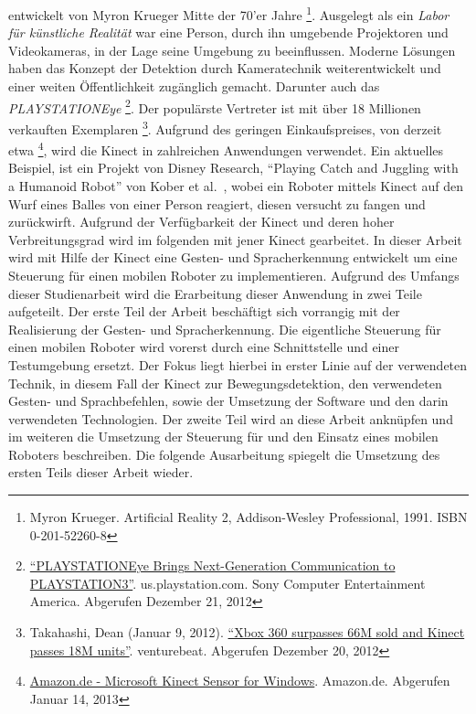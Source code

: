  entwickelt von Myron Krueger Mitte der 70'er Jahre \footnote{Myron Krueger. Artificial Reality 2, Addison-Wesley Professional, 1991. ISBN 0-201-52260-8}.
Ausgelegt als ein \textit{Labor f\"ur k\"unstliche Realit\"at} war eine Person, durch ihn umgebende Projektoren und Videokameras, in der Lage seine Umgebung zu beeinflussen.
Moderne L\"osungen haben das Konzept der Detektion durch Kameratechnik weiterentwickelt und einer weiten \"Offentlichkeit zug\"anglich gemacht. Darunter auch das \textit{PLAYSTATIONEye}
\footnote{\href{http://us.playstation.com/ps3/accessories/playstation-eye-camera-ps3.html}{\enquote{PLAYSTATIONEye Brings Next-Generation Communication to PLAYSTATION3}}. us.playstation.com. Sony Computer Entertainment America. Abgerufen Dezember 21, 2012}.
Der popul\"arste Vertreter ist \textit{} mit \"uber 18 Millionen verkauften Exemplaren
\footnote{Takahashi, Dean (Januar 9, 2012). \href{http://venturebeat.com/2012/01/09/xbox-360-surpassed-66m-sold-and-kinect-has-sold-18m-units/}{\enquote{Xbox 360 surpasses 66M sold and Kinect passes 18M units}}. venturebeat. Abgerufen Dezember 20, 2012}.
\newline
Aufgrund des geringen Einkaufspreises, von derzeit etwa \footnote{\href{http://www.amazon.de/Microsoft-Kinect-Sensor-for-Windows/dp/B0072O6E7K/ref=sr_1_1?ie=UTF8&qid=1358250080&sr=8-1}{Amazon.de - Microsoft Kinect Sensor for Windows}. Amazon.de. Abgerufen Januar 14, 2013}, wird die Kinect in zahlreichen Anwendungen verwendet. Ein aktuelles Beispiel, ist ein Projekt von Disney Research, \enquote{Playing Catch and Juggling with a Humanoid Robot} von Kober et al.~\cite{bib:kober}, wobei ein Roboter mittels Kinect auf den Wurf eines Balles von einer Person reagiert, diesen versucht zu fangen und zur\"uckwirft.
\newline
Aufgrund der Verf\"ugbarkeit der Kinect und deren hoher Verbreitungsgrad wird im folgenden mit jener Kinect gearbeitet.
\newline
In dieser Arbeit wird mit Hilfe der Kinect eine Gesten- und Spracherkennung entwickelt um eine Steuerung f\"ur einen mobilen Roboter zu implementieren.
Aufgrund des Umfangs dieser Studienarbeit wird die Erarbeitung dieser Anwendung in zwei Teile aufgeteilt.
\newline
Der erste Teil der Arbeit besch\"aftigt sich vorrangig mit der Realisierung der Gesten- und Spracherkennung.
Die eigentliche Steuerung f\"ur einen mobilen Roboter wird vorerst durch eine Schnittstelle und einer Testumgebung ersetzt.
Der Fokus liegt hierbei in erster Linie auf der verwendeten Technik, in diesem Fall der Kinect zur \gls{Bewegungsdetektion}, den verwendeten Gesten- und Sprachbefehlen,
sowie der Umsetzung der Software und den darin verwendeten Technologien.
Der zweite Teil wird an diese Arbeit ankn\"upfen und im weiteren die Umsetzung der Steuerung f\"ur und den Einsatz eines mobilen Roboters beschreiben.
\newline
Die folgende Ausarbeitung spiegelt die Umsetzung des ersten Teils dieser Arbeit wieder.